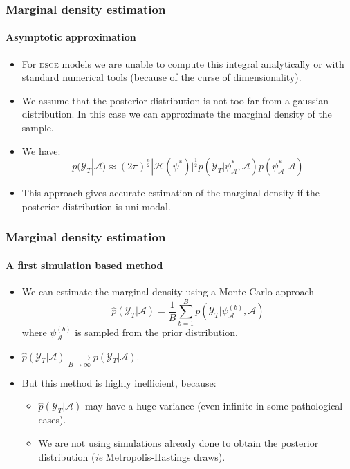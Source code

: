 \documentclass[10pt,slidestop]{beamer}
\newcommand{\sample}{\mathcal Y_T}
\begin{document}
\begin{frame}
  \frametitle{Marginal density estimation}
  \framesubtitle{Asymptotic approximation}

  \begin{itemize}

  \item For \textsc{dsge} models we are unable to compute this
    integral analytically or with standard numerical tools (because of
    the curse of dimensionality).

\bigskip

  \item We assume that the posterior distribution is not too far from
    a gaussian distribution. In this case we can approximate the
    marginal density of the sample.

\bigskip

  \item We have:
    \medskip
    \[
    p(\sample|\mathcal{A}) \approx
    (2\pi)^{\frac{n}{2}}|\mathcal
    H(\psi^{\ast})|^{\frac{1}{2}}p(\sample|\psi_{\mathcal{A}}^{\ast} ,\mathcal{A})
    p(\psi_{\mathcal{A}}^{\ast}|\mathcal{A})
    \]

\bigskip

  \item This approach gives accurate estimation of the marginal
  density if the posterior distribution is uni-modal.

\end{itemize}

\end{frame}


\begin{frame}
  \frametitle{Marginal density estimation}
  \framesubtitle{A first simulation based method}

  \begin{itemize}

  \item We can estimate the marginal density using a Monte-Carlo approach
    \[
    \widehat{p}(\sample|\mathcal{A}) = \frac{1}{B}\sum_{b=1}^B
    p(\sample|\psi_{\mathcal{A}}^{(b)},\mathcal{A})
    \]
    where $\psi_{\mathcal{A}}^{(b)}$ is sampled from the
    prior distribution.

\bigskip

  \item $\widehat{p}(\sample|\mathcal{A})
    \underset{B\rightarrow\infty}{\longrightarrow}
    p(\sample|\mathcal{A})$.

\bigskip

  \item But this method is highly inefficient,
    because:
    \begin{itemize}
    \item $\widehat{p}(\sample|\mathcal{A})$
      may have a huge variance (even infinite in some pathological cases).
    \item We are not using simulations already done
      to obtain the posterior distribution (\textit{ie}
      Metropolis-Hastings draws).
    \end{itemize}
  \end{itemize}

\end{frame}
\end{document}
